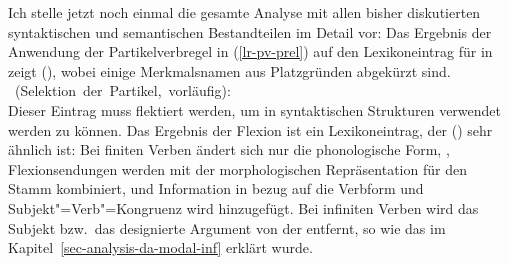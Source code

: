 Ich stelle jetzt noch einmal die gesamte Analyse mit allen bisher diskutierten syntaktischen
und semantischen Bestandteilen im Detail vor: Das Ergebnis der Anwendung der Partikelverbregel in (\ref{lr-pv-prel})
auf den Lexikoneintrag für  in  zeigt (), wobei einige
Merkmalsnamen aus Platzgründen abgekürzt sind.
%
\newsavebox{\boxxcomp}
%
\eas
\label{le-lach-+particle-prel}
\mbox{ (Selektion der Partikel, vorläufig):}\\
\zs
%
Dieser Eintrag muss flektiert werden, um in syntaktischen Strukturen verwendet werden zu können.
Das Ergebnis der Flexion ist ein Lexikoneintrag, der () sehr ähnlich ist: Bei finiten
Verben ändert sich nur die phonologische Form, \dash, Flexionsendungen werden mit der morphologischen
Repräsentation für den Stamm kombiniert, und Information in bezug auf die Verbform und Subjekt"=Verb"=Kongruenz
wird hinzugefügt. Bei infiniten Verben wird das Subjekt bzw.\ das designierte Argument
von der \compsl entfernt, so wie das im Kapitel~\ref{sec-analysis-da-modal-inf} erklärt wurde.
 
